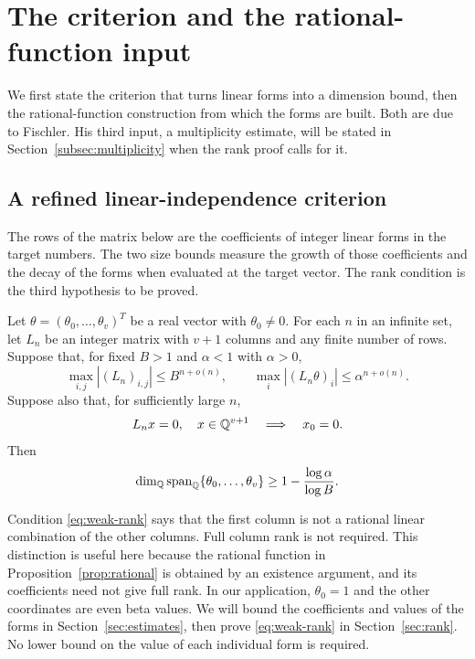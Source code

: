 \section{The criterion and the rational-function input}\label{sec:inputs}

We first state the criterion that turns linear forms into a dimension
bound, then the rational-function construction from which the forms
are built. Both are due to Fischler. His third input, a multiplicity
estimate, will be stated in Section~\ref{subsec:multiplicity} when the
rank proof calls for it.

\subsection{A refined linear-independence criterion}

The rows of the matrix below are the coefficients of integer linear
forms in the target numbers. The two size bounds measure the growth of
those coefficients and the decay of the forms when evaluated at the
target vector. The rank condition is the third hypothesis to be proved.

\begin{proposition}
\label{prop:criterion}
Let $\theta=(\theta_0,\ldots,\theta_v)^T$ be a real vector with
$\theta_0\neq0$.
For each $n$ in an infinite set, let $L_n$ be an integer matrix with
$v+1$ columns and any finite number of rows.
Suppose that, for fixed $B>1$ and $\alpha<1$ with $\alpha>0$,
\[
 \max_{i,j}|(L_n)_{i,j}|\leq B^{n+o(n)},\qquad
 \max_i|(L_n\theta)_i|\leq\alpha^{n+o(n)}.
\]
Suppose also that, for sufficiently large $n$,
\begin{equation}\label{eq:weak-rank}
 L_nx=0,\quad x\in\mathbb Q^{v+1}\quad\Longrightarrow\quad x_0=0.
\end{equation}
Then
\[
 \dim_\mathbb Q\operatorname{span}_\mathbb Q\{\theta_0,\ldots,\theta_v\}
       \geq1-\frac{\log\alpha}{\log B}.
\]
\end{proposition}

Condition \eqref{eq:weak-rank} says that the first column is not a
rational linear combination of the other columns. Full column rank is
not required. This distinction is useful here because the rational
function in Proposition~\ref{prop:rational} is obtained by an existence
argument, and its coefficients need not give full rank.
In our application, $\theta_0=1$ and the other coordinates are even beta
values. We will bound the coefficients and values of the forms in
Section~\ref{sec:estimates}, then prove \eqref{eq:weak-rank} in
Section~\ref{sec:rank}. No lower bound on the value of each individual
form is required.

